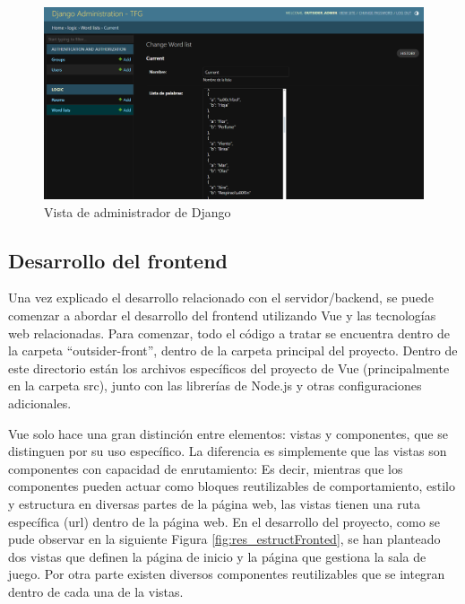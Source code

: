 \begin{figure}[h]
	\centering
	\includegraphics[width=\textwidth,clip=true]{res_admin.png}
	\caption{Vista de administrador de Django}
	\label{fig:res_admin}
\end{figure}

\subsection{Desarrollo del frontend} \label{Desarrollo del frontend}

Una vez explicado el desarrollo relacionado con el servidor/backend, se puede comenzar a abordar el desarrollo del frontend utilizando Vue
y las tecnologías web relacionadas. Para comenzar, todo el código a tratar se encuentra dentro de la carpeta ``outsider-front'', dentro de la carpeta
principal del proyecto. Dentro de este directorio están los archivos específicos del proyecto de Vue (principalmente en la carpeta src), junto con las librerías de Node.js y otras 
configuraciones adicionales.

Vue solo hace una gran distinción entre elementos: vistas y componentes, que se distinguen por su uso específico. La diferencia es simplemente que 
las vistas son componentes con capacidad de enrutamiento: Es decir, mientras que los componentes pueden actuar como bloques reutilizables de comportamiento, estilo 
y estructura en diversas partes de la página web, las vistas tienen una ruta específica (url) dentro de la página web. En el desarrollo del proyecto, como se pude observar 
en la siguiente Figura \ref{fig:res_estructFronted}, se han planteado dos vistas que definen la página de inicio y la página que gestiona la sala de juego. Por otra parte
existen diversos componentes reutilizables que se integran dentro de cada una de la vistas.

